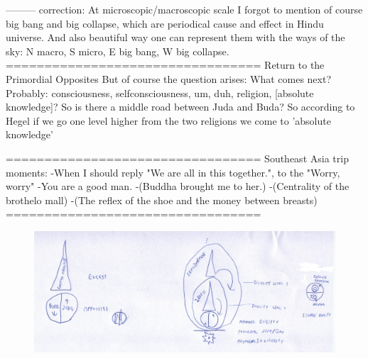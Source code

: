 \documentclass[10pt]{book}
\begin{document}
---------
correction:
At microscopic/macroscopic scale I forgot to mention of course big bang and big collapse, which are periodical cause and effect in Hindu universe. And also beautiful way one can represent them with the ways of the sky: N macro, S micro, E big bang, W big collapse.
=================================
Return to the Primordial Opposites
But of course the question arises: What comes next? Probably: consciousness, selfconsciousness, um, duh, religion, [absolute knowledge]?
So is there a middle road between Juda and Buda?
So according to Hegel if we go one level higher from the two religions we come to 'absolute knowledge'

=================================
Southeast Asia trip moments:
-When I should reply "We are all in this together.", to the "Worry, worry"
-You are a good man.
-(Buddha brought me to her.)
-(Centrality of the brothelo mall)
-(The reflex of the shoe and the money between breasts)
=================================

\begin{figure}[ht!]
\centering
\includegraphics[width=120mm]{scan00.jpg}
\label{overflow}
\end{figure}
\end{document}

